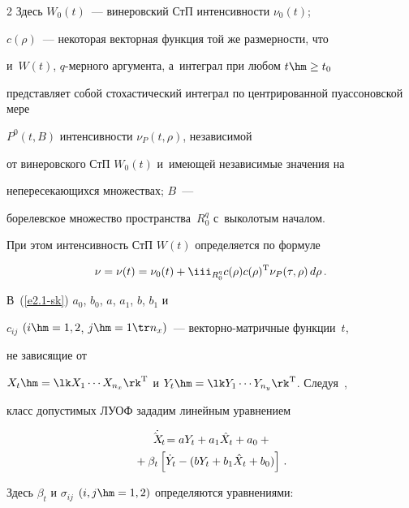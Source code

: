 \begin{multicols}{2}
Здесь $W_0(t)$~--- винеровский СтП интенсивности  $\nu_0(t)$;

$c(\rho)$~--- некоторая векторная функция той же размерности, что

и~$W(t)$, $q$-мер\-но\-го аргумента, а~интеграл при любом  $t\hm\ge t_0$

представляет собой стохастический интеграл по центрированной пуассоновской мере

$P^0 (t, B)$ интенсивности $\nu_P (t, \rho)$, независимой

от винеровского СтП $W_0(t)$ и~име\-ющей независимые значения на

непересекающихся множествах; $B$~---

борелевское множество пространства~$R_0^q$ с~выколотым началом.

При этом интенсивность СтП $W(t)$ определяется по формуле~\cite{1-sk, 3-sk, 4-sk}

\begin{equation*}

\nu =\nu(t) = \nu_0(t) +

\iii_{R_0^q} c(\rho) c (\rho)^{\mathrm{T}}

 \nu_P (\tau,\rho)\, d\rho\,. %

\end{equation*}

В~(\ref{e2.1-sk}) $a_0$, $b_0$, $a$, $a_1$, $b$, $b_1$ и

$c_{ij}$ $(i\hm=1,2$, $j\hm=1\tr n_x)$~--- век\-тор\-но-мат\-рич\-ные функции~$t$,

не зависящие от

$X_t\hm=\lk X_1\cdots X_{n_x}\rk^{\mathrm{T}}$ и $Y_t \hm=\lk

Y_1\cdots Y_{n_y}\rk^{\mathrm{T}}$. Следуя~\cite{1-sk, 3-sk, 4-sk},

класс допустимых ЛУОФ зададим линейным уравнением

\begin{multline}

\dot{\hx_t} =a Y_t +a_{1}\hx_t + a_{0} +{}\\

{}+\beta_t \left[ \dot Y_t -

(b Y_t + b_{1}\hx_t + b_{0})\right]\,.\label{e2.4-sk}

\end{multline}

Здесь $\beta_t$ и $\sigma_{ij}$ $(i,j\hm=1,2)$ определяются уравне\-ниями:

\begin{align}


\end{align}
\end{multicols}
